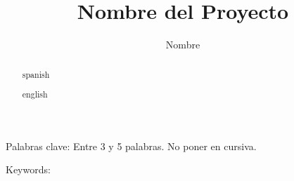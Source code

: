 \documentclass{tesisUNADE}
\title{Nombre del Proyecto}
\author{Nombre}
\begin{document}
\maketitle

\begin{abstract}{spanish}
\lipsum[1]

\end{abstract}
Palabras clave: Entre 3 y 5 palabras. No poner en cursiva. 
\begin{abstract}{english}
\lipsum[1]
\end{abstract}
Keywords: 






\renewcommand{\contentsname}{Tabla de contenido}
\tableofcontents
\setcounter{page}{1}
\renewcommand{\listfigurename}{Tabla de figuras}
\renewcommand{\listtablename}{Tabla de tablas}
\listoftables
\listoffigures




\newpage
{}
\setcounter{page}{1}








\clearpage


\end{document}
